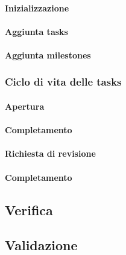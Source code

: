 	\paragraph{Inizializzazione}
	\paragraph{Aggiunta tasks}
	\paragraph{Aggiunta milestones}

\subsubsection{Ciclo di vita delle tasks}
	\paragraph{Apertura}
	\paragraph{Completamento}
	\paragraph{Richiesta di revisione}
	\paragraph{Completamento}


\subsection{Verifica}
	
\subsection{Validazione}

